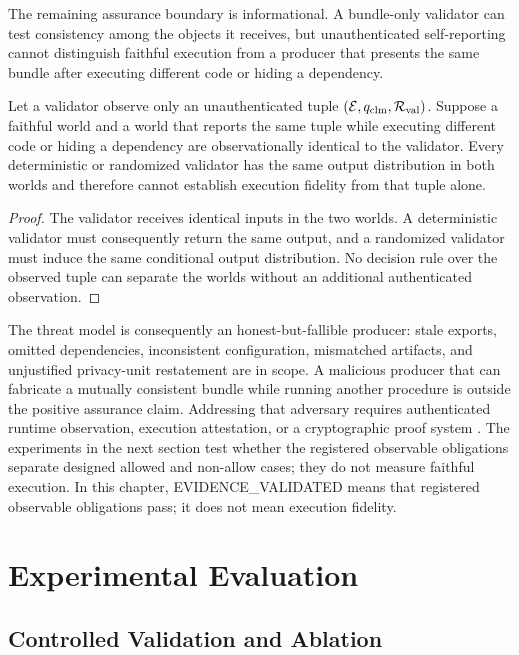 The remaining assurance boundary is informational.  A bundle-only validator can
test consistency among the objects it receives, but unauthenticated self-reporting
cannot distinguish faithful execution from a producer that presents the same
bundle after executing different code or hiding a dependency.

\begin{proposition}
\label{prop:ch2-bundle-only-non-attestation}
Let a validator observe only an unauthenticated tuple
\((\mathcal{E},q_{\mathrm{clm}},\mathcal{R}_{\mathrm{val}})\).  Suppose a faithful world
and a world that reports the same tuple while executing different code or hiding
a dependency are observationally identical to the validator.  Every deterministic
or randomized validator has the same output distribution in both worlds and
therefore cannot establish execution fidelity from that tuple alone.
\end{proposition}

\begin{proof}[Proof]
The validator receives identical inputs in the two worlds.  A deterministic
validator must consequently return the same output, and a randomized validator
must induce the same conditional output distribution.  No decision rule over the
observed tuple can separate the worlds without an additional authenticated
observation.
\end{proof}

The threat model is consequently an honest-but-fallible producer: stale exports,
omitted dependencies, inconsistent configuration, mismatched artifacts, and
unjustified privacy-unit restatement are in scope.  A malicious producer that can
fabricate a mutually consistent bundle while running another procedure is outside
the positive assurance claim.  Addressing that adversary requires authenticated
runtime observation, execution attestation, or a cryptographic proof system
\cite{narayan2015verifiable,shamsabadi2024confidential}.  The experiments in the
next section test whether the registered observable obligations separate designed
allowed and non-allow cases; they do not measure faithful execution.  In this
chapter, \textsf{EVIDENCE\_VALIDATED} means that registered observable obligations
pass; it does not mean execution fidelity.

\section{Experimental Evaluation}
\subsection{Controlled Validation and Ablation}
\label{subsec:controlled-validation-ablation}

